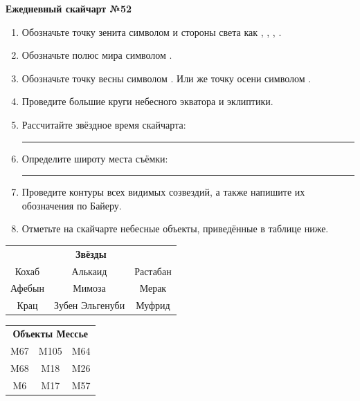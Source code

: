 \documentclass{./SAS-class-skygen}
\begin{document}
    
    
    
	\begin{center}
		\large\textbf{Ежедневный скайчарт №52}
	\end{center}

	\begin{enumerate}
		\item Обозначьте точку зенита символом  и стороны света как , , , .
		\item Обозначьте полюс мира символом .
		\item Обозначьте точку весны символом \Aries. Или же точку осени символом \Libra.
		\item Проведите большие круги небесного экватора и эклиптики.
		\item Рассчитайте звёздное время скайчарта: \rule{2cm}{0.4pt}
		\item Определите широту места съёмки: \rule{2cm}{0.4pt}
		\item Проведите контуры всех видимых созвездий, а также напишите их обозначения по Байеру.
		\item Отметьте на скайчарте небесные объекты, приведённые в таблице ниже.
	\end{enumerate}
	
    \vspace{0.5cm}

    \begin{table}[h!]
    \centering
    \begin{tabular}{ccc}
    \multicolumn{3}{c}{\textbf{Звёзды}} \\ Кохаб & Алькаид & Растабан \\
Афебын & Мимоза & Мерак \\
Крац & Зубен Эльгенуби & Муфрид \\

\end{tabular}
    \hfill
    \begin{tabular}{ccc}
    \multicolumn{3}{c}{\textbf{Объекты Мессье}} \\ M67 & M105 & M64 \\
M68 & M18 & M26 \\
M6 & M17 & M57 \\

\end{tabular}
    \end{table}
	
\end{document}
